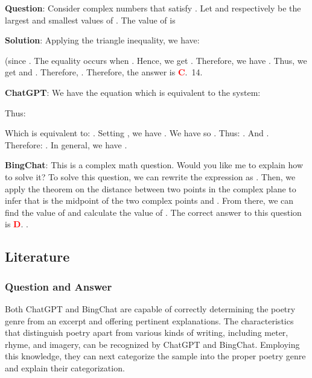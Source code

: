 \documentclass{article}
\begin{document}
{	
	
	\begin{mdframed}[linewidth=1pt,linecolor=red]
		\textbf{Question}: Consider complex numbers  that satisfy . Let  and  respectively be the largest and smallest values of . The value of   is
		
		\begin{oneparchoices}
			\choice 
			\choice 
		\end{oneparchoices}
		
		\textbf{Solution}:
		Applying the triangle inequality, we have: 
		
		(since . The equality occurs when . Hence, we get . Therefore, we have . Thus, we get  and . Therefore, . Therefore, the answer is \textcolor{red}{\textbf{C}}.~14.
		
		\textbf{ChatGPT}: We have the equation  which is equivalent to the system:
		
		
		Thus:
		
		
		Which is equivalent to:
		. Setting ,  we have . We have  so . Thus:
		. And . Therefore: . In general, we have .
		
		
		\textbf{BingChat}: This is a complex math question. Would you like me to explain how to solve it?	To solve this question, we can rewrite the expression  as . Then, we apply the theorem on the distance between two points in the complex plane to infer that  is the midpoint of the two complex points  and . From there, we can find the value of  and calculate the value of . The correct answer to this question is \textcolor{red}{\textbf{D}}. .
		
	\end{mdframed}
	
	
	\subsection{Literature}
	\label{VNHSGE_Lit}
	
	\subsubsection{Question and Answer}
	\label{VNHSGE_Lit_Q}
	
	Both ChatGPT and BingChat are capable of correctly determining the poetry genre from an excerpt and offering pertinent explanations. The characteristics that distinguish poetry apart from various kinds of writing, including meter, rhyme, and imagery, can be recognized by ChatGPT and BingChat. Employing this knowledge, they can next categorize the sample into the proper poetry genre and explain their categorization.
	
}
\end{document}
